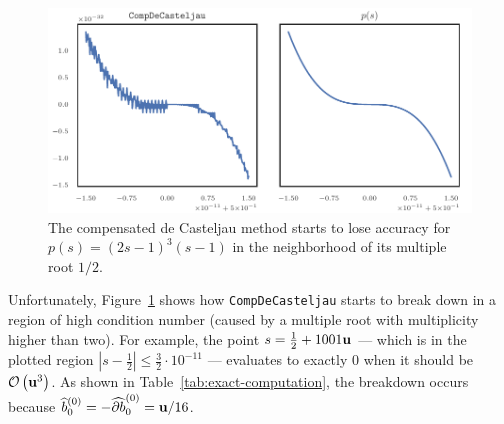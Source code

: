 \begin{figure}
  \includegraphics{../images/k-compensated/compensated_insufficient.pdf}
  \centering
  \captionsetup{width=.75\linewidth}
  \caption{The compensated de Casteljau method starts to lose accuracy
    for \(p(s) = (2s - 1)^3 (s - 1)\) in the neighborhood of its
    multiple root \(1/2\).}
  \label{fig:compensated-insufficient}
\end{figure}

Unfortunately, Figure~\ref{fig:compensated-insufficient} shows how
\texttt{CompDeCasteljau} starts to break down in a region of
high condition number (caused by a multiple root with multiplicity
higher than two). For example, the point
\(s = \frac{1}{2} + 1001\mathbf{u}\)
--- which is in the plotted region \(\left|s - \frac{1}{2}\right|
\leq \frac{3}{2} \cdot 10^{-11}\) --- evaluates to exactly \(0\) when
it should be \(\mathcal{O}\left(\mathbf{u}^3\right)\). As shown in
Table~\ref{tab:exact-computation}, the breakdown occurs because
\(\widehat{b}_0^{(0)} = -\cdb{1}_0^{(0)} = \mach / 16\).

